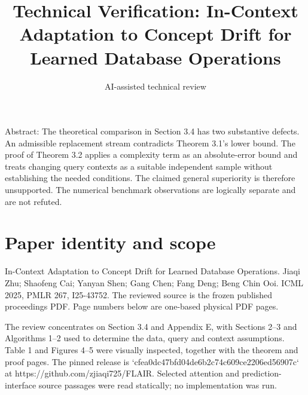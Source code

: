 \documentclass[10pt]{article}
\title{Technical Verification: In-Context Adaptation to Concept Drift for Learned Database Operations}
\author{AI-assisted technical review}
\date{}
\begin{document}
\maketitle
Abstract: The theoretical comparison in Section 3.4 has two substantive defects. An admissible replacement stream contradicts Theorem 3.1’s lower bound. The proof of Theorem 3.2 applies a complexity term as an absolute-error bound and treats changing query contexts as a suitable independent sample without establishing the needed conditions. The claimed general superiority is therefore unsupported. The numerical benchmark observations are logically separate and are not refuted.\par
\section*{Paper identity and scope}
In-Context Adaptation to Concept Drift for Learned Database Operations. Jiaqi Zhu; Shaofeng Cai; Yanyan Shen; Gang Chen; Fang Deng; Beng Chin Ooi. ICML 2025, PMLR 267, I25-43752. The reviewed source is the frozen published proceedings PDF. Page numbers below are one-based physical PDF pages.\par
The review concentrates on Section 3.4 and Appendix E, with Sections 2–3 and Algorithms 1–2 used to determine the data, query and context assumptions. Table 1 and Figures 4–5 were visually inspected, together with the theorem and proof pages. The pinned release is `cfea0dc47bfd04de6b2c74c609ce2206ed56907c` at https://github.com/zjiaqi725/FLAIR. Selected attention and prediction-interface source passages were read statically; no implementation was run.\par
\end{document}

